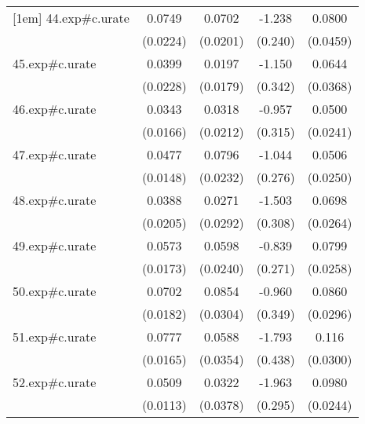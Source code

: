 {\begin{tabular}{l*{4}{c}}
[1em]
44.exp#c.urate&      0.0749\sym{**} &      0.0702\sym{**} &      -1.238\sym{***}&      0.0800         \\
            &    (0.0224)         &    (0.0201)         &     (0.240)         &    (0.0459)         \\
[1em]
45.exp#c.urate&      0.0399         &      0.0197         &      -1.150\sym{**} &      0.0644         \\
            &    (0.0228)         &    (0.0179)         &     (0.342)         &    (0.0368)         \\
[1em]
46.exp#c.urate&      0.0343\sym{*}  &      0.0318         &      -0.957\sym{**} &      0.0500\sym{*}  \\
            &    (0.0166)         &    (0.0212)         &     (0.315)         &    (0.0241)         \\
[1em]
47.exp#c.urate&      0.0477\sym{**} &      0.0796\sym{**} &      -1.044\sym{***}&      0.0506\sym{*}  \\
            &    (0.0148)         &    (0.0232)         &     (0.276)         &    (0.0250)         \\
[1em]
48.exp#c.urate&      0.0388         &      0.0271         &      -1.503\sym{***}&      0.0698\sym{*}  \\
            &    (0.0205)         &    (0.0292)         &     (0.308)         &    (0.0264)         \\
[1em]
49.exp#c.urate&      0.0573\sym{**} &      0.0598\sym{*}  &      -0.839\sym{**} &      0.0799\sym{**} \\
            &    (0.0173)         &    (0.0240)         &     (0.271)         &    (0.0258)         \\
[1em]
50.exp#c.urate&      0.0702\sym{***}&      0.0854\sym{**} &      -0.960\sym{**} &      0.0860\sym{**} \\
            &    (0.0182)         &    (0.0304)         &     (0.349)         &    (0.0296)         \\
[1em]
51.exp#c.urate&      0.0777\sym{***}&      0.0588         &      -1.793\sym{***}&       0.116\sym{***}\\
            &    (0.0165)         &    (0.0354)         &     (0.438)         &    (0.0300)         \\
[1em]
52.exp#c.urate&      0.0509\sym{***}&      0.0322         &      -1.963\sym{***}&      0.0980\sym{***}\\
            &    (0.0113)         &    (0.0378)         &     (0.295)         &    (0.0244)         \\

\end{tabular}}
